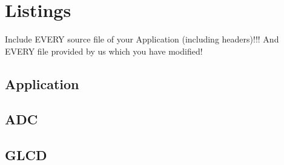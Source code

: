 \section{Listings}
\small{

Include EVERY source file of your Application (including headers)!!!
And EVERY file provided by us which you have modified!

\subsection{Application}














\subsection{ADC}





\subsection{GLCD}









}
